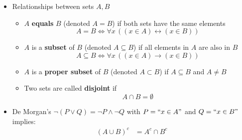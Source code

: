 \documentclass[11pt,twoside]{report}
\begin{document}
\begin{itemize}
\hspace{1in}



\item Relationships between sets $A,B$ 
\begin{itemize} 
  \item $A$ \textbf{equals} $B$ (denoted $A=B$) if both sets have the same elements
\[ 
A=B\iff \forall x\,  \left( (x\in A)\leftrightarrow (x\in B) \right) 
\]
  \item $A$ is a \textbf{subset} of $B$ (denoted $A\subseteq B$) if all elements in $A$ are also in $B$
\[ 
A\subseteq B
  \iff \forall x\,  \left( (x\in A)\rightarrow (x\in B) \right) \]
 \item $A$ is a \textbf{proper subset} of $B$ (denoted $A\subset B$) if $A\subseteq B$ and $A\neq B$ 
\item Two sets are called \textbf{disjoint} if 
  \[
  A\cap B = \emptyset
  \]
\end{itemize}


\item De Morgan's $\neg (P \vee Q) = \neg P \wedge \neg Q$ with $P = ``x \in A"$ and $Q=``x\in B"$ implies: 
\begin{align*}
(A \cup B)^c & = A^c \cap B^c
\end{align*}


\end{itemize}
\end{document}
